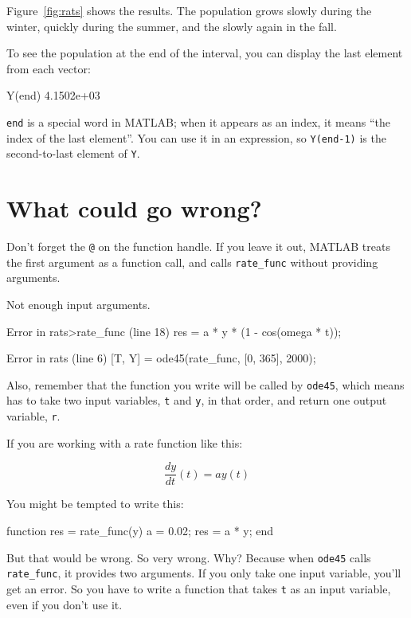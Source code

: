 \documentclass[
]{book}
\numberwithin{Answer}{chapter}
\numberwithin{Exercise}{chapter}
\begin{document}
Figure~\ref{fig:rats} shows the results.  The population grows slowly during the winter, quickly during the summer, and the slowly again in the fall.

To see the population at the end of the interval, 
you can display the last element from each vector:

\begin{code}
Y(end)
4.1502e+03
\end{code}

{\tt end} is a special word in MATLAB; when it appears as an index,
it means ``the index of the last element''.  You can use it in an
expression, so {\tt Y(end-1)} is the second-to-last element of
{\tt Y}.


\section{What could go wrong?}

Don't forget the {\tt @} on the function handle.
If you leave it out, MATLAB treats the first argument as a function
call, and calls \verb"rate_func" without providing arguments.

\begin{code}
Not enough input arguments.

Error in rats>rate_func (line 18)
    res = a * y * (1 - cos(omega * t));

Error in rats (line 6)
    [T, Y] = ode45(rate_func, [0, 365], 2000);
\end{code}

Also, remember that the function you write will be called by
{\tt ode45}, which means has to take two input variables, 
{\tt t} and {\tt y}, in that order, and return one output variable, 
{\tt r}.

If you are working with a rate function like this:

\begin{equation}
\frac{dy}{dt}(t) = a y(t)
\end{equation}

You might be tempted to write this:

\begin{code}
function res = rate_func(y)        %
    a = 0.02;
    res = a * y;
end
\end{code}

But that would be wrong.  So very wrong.  Why?  Because
when {\tt ode45} calls {\tt rate\_func}, it provides two arguments.
If you only take one input variable, you'll get an error.  So
you have to write a function that takes {\tt t} as an input
variable, even if you don't use it.
\end{document}
